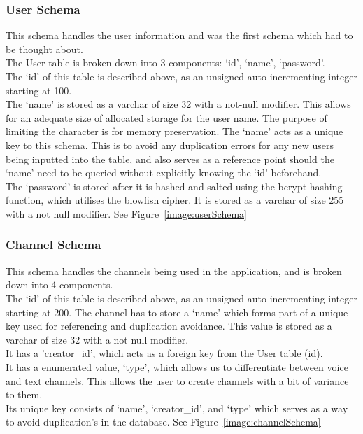 \subsubsection{User Schema}
This schema handles the user information and was the first schema which had to be thought about.
\\ The User table is broken down into 3 components: ‘id’, ‘name’, ‘password’.
\\The ‘id’ of this table is described above, as an unsigned auto-incrementing integer starting at 100.
\\The ‘name’ is stored as a varchar of size 32 with a not-null modifier. This allows for an adequate size of allocated storage for the user name. The purpose of limiting the character is for memory preservation. The ‘name’ acts as a unique key to this schema. This is to avoid any duplication errors for any new users being inputted into the table, and also serves as a reference point should the ‘name’ need to be queried without explicitly knowing the ‘id’ beforehand. 
\\The ‘password’ is stored after it is hashed and salted using the bcrypt hashing function, which utilises the blowfish cipher. It is stored as a varchar of size 255 with a not null modifier.
See Figure~\ref{image:userSchema}

\subsubsection{Channel Schema}
This schema handles the channels being used in the application, and is broken down into 4 components.
\\The ‘id’ of this table is described above, as an unsigned auto-incrementing integer starting at 200.
The channel has to store a ‘name’ which forms part of a unique key used for referencing and duplication avoidance. This value is stored as a varchar of size 32 with a not null modifier.
\\It has a 'creator\_id', which acts as a foreign key from the User table (id).
\\It has a enumerated value, ‘type’, which allows us to differentiate between voice and text channels. This allows the user to create channels with a bit of variance to them.
\\Its unique key consists of ‘name’, ‘creator\_id’, and ‘type’ which serves as a way to avoid duplication's in the database.
See Figure~\ref{image:channelSchema}

